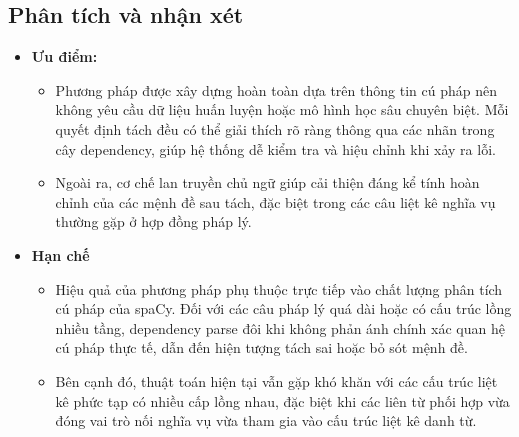 \subsection{Phân tích và nhận xét}
\begin{itemize}

    \item \textbf{Ưu điểm:}
    \begin{itemize}

        \item Phương pháp được xây dựng hoàn toàn dựa trên thông tin cú pháp nên không
        yêu cầu dữ liệu huấn luyện hoặc mô hình học sâu chuyên biệt. Mỗi quyết
        định tách đều có thể giải thích rõ ràng thông qua các nhãn trong cây
        dependency, giúp hệ thống dễ kiểm tra và hiệu chỉnh khi xảy ra lỗi.

        \item Ngoài ra, cơ chế lan truyền chủ ngữ giúp cải thiện đáng kể tính hoàn
        chỉnh của các mệnh đề sau tách, đặc biệt trong các câu liệt kê nghĩa vụ
        thường gặp ở hợp đồng pháp lý.

    \end{itemize}

    \item \textbf{Hạn chế}
    \begin{itemize}

        \item Hiệu quả của phương pháp phụ thuộc trực tiếp vào chất lượng phân tích cú
        pháp của spaCy. Đối với các câu pháp lý quá dài hoặc có cấu trúc lồng
        nhiều tầng, dependency parse đôi khi không phản ánh chính xác quan hệ cú
        pháp thực tế, dẫn đến hiện tượng tách sai hoặc bỏ sót mệnh đề.

        \item Bên cạnh đó, thuật toán hiện tại vẫn gặp khó khăn với các cấu trúc liệt
        kê phức tạp có nhiều cấp lồng nhau, đặc biệt khi các liên từ phối hợp vừa
        đóng vai trò nối nghĩa vụ vừa tham gia vào cấu trúc liệt kê danh từ.
    \end{itemize}
    
\end{itemize}